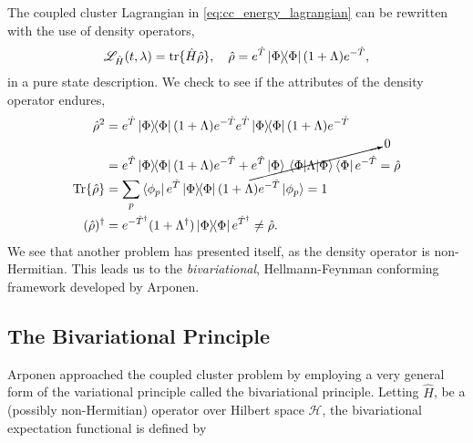 The coupled cluster Lagrangian in \autoref{eq:cc_energy_lagrangian} can be rewritten 
with the use of density operators,
\begin{equation}
    \mathscr{L}_{\hat{H}}(t, \lambda) = \tr\{\hat{H}\hat{\rho}\}, \quad
    \hat{\rho} = e^{\hat{T}}\outerproduct{\Phi}(1 + \Lambda)e^{-\hat{T}},
\end{equation}
in a pure state description. We check to see if the attributes of the density operator 
endures,
\begin{align*}
    \hat{\rho}^2 &= 
        e^{\hat{T}}\outerproduct{\Phi}(1 + \Lambda)e^{-\hat{T}}
        e^{\hat{T}}\outerproduct{\Phi}(1 + \Lambda)e^{-\hat{T}} \\
        &= 
        e^{\hat{T}}\outerproduct{\Phi}(1 + \Lambda)e^{-\hat{T}}
        + \cancelto{0}{e^{\hat{T}}\ket{\Phi}
        \mel{\Phi}{\Lambda}{\Phi}
        \bra{\Phi}e^{-\hat{T}}} 
        = \hat{\rho} \\
    \Tr{\hat{\rho}} &= \sum_{p} \bra{\phi_p}e^{\hat{T}}\outerproduct{\Phi}(1 + \Lambda)e^{-\hat{T}} \ket{\phi_p}
    = 1 \\
    (\hat{\rho})^\dagger &= e^{-\hat{T}^\dagger}(1 + \Lambda^\dagger)
    \dyad{\Phi}e^{\hat{T}^\dagger} \neq \hat{\rho}.
\end{align*}
We see that another problem has 
presented itself, as the density operator is non-Hermitian. This leads us to the 
\emph{bivariational},
Hellmann-Feynman conforming framework developed by 
Arponen\cite{arponen1983variational}.


\subsection{The Bivariational Principle}

Arponen approached the coupled cluster problem by employing a very general form 
of the variational principle called the bivariational principle. Letting $\hat{H}$,
be a (possibly non-Hermitian) operator over Hilbert space $\mathcal{H}$, the bivariational 
expectation functional is defined by 

